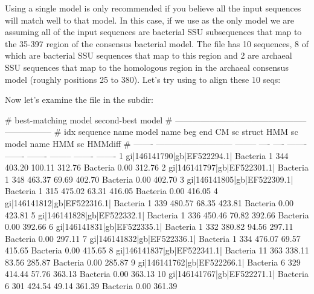 Using a single model is only recommended if you believe all the input
sequences will match well to that model. In this case, if we use
 as the only model we are assuming all of the input
sequences are bacterial SSU subsequences that map to the 35-397 region
of the consensus bacterial model. The file  has 10
sequences, 8 of which are bacterial SSU sequences that map to this region
and 2 are archaeal SSU sequences that map to the homologous region in
the archaeal consensus model (roughly positions 25 to 380). Let's try
using  to align these 10 seqs:


Now let's examine the  file in the 
subdir:

\begin{sreoutput}
#                                                     best-matching model                second-best model  
#                                       -----------------------------------------------  -----------------  
#     idx  sequence name                model name   beg   end    CM sc   struct   HMM sc  model name   HMM sc  HMMdiff
# -------  ---------------------------  --------  ----  ----  -------  -------  -------  --------  -------  -------
        1  gi|146141790|gb|EF522294.1|  Bacteria     1   344   403.20   100.11   312.76  Bacteria     0.00   312.76
        2  gi|146141797|gb|EF522301.1|  Bacteria     1   348   463.37    69.69   402.70  Bacteria     0.00   402.70
        3  gi|146141805|gb|EF522309.1|  Bacteria     1   315   475.02    63.31   416.05  Bacteria     0.00   416.05
        4  gi|146141812|gb|EF522316.1|  Bacteria     1   339   480.57    68.35   423.81  Bacteria     0.00   423.81
        5  gi|146141828|gb|EF522332.1|  Bacteria     1   336   450.46    70.82   392.66  Bacteria     0.00   392.66
        6  gi|146141831|gb|EF522335.1|  Bacteria     1   332   380.82    94.56   297.11  Bacteria     0.00   297.11
        7  gi|146141832|gb|EF522336.1|  Bacteria     1   334   476.07    69.57   415.65  Bacteria     0.00   415.65
        8  gi|146141837|gb|EF522341.1|  Bacteria    11   363   338.11    83.56   285.87  Bacteria     0.00   285.87
        9  gi|146141762|gb|EF522266.1|  Bacteria     6   329   414.44    57.76   363.13  Bacteria     0.00   363.13
       10  gi|146141767|gb|EF522271.1|  Bacteria     6   301   424.54    49.14   361.39  Bacteria     0.00   361.39
\end{sreoutput}

